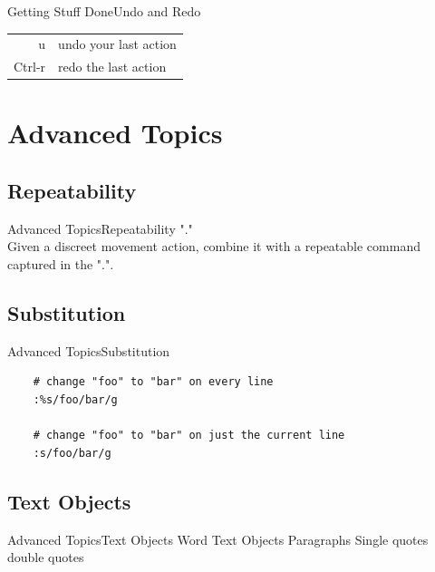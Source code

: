 \documentclass{beamer}
\begin{document}
\begin{frame}[t]{Getting Stuff Done}{Undo and Redo}
    \begin{table}[htpb]
        \centering
        \begin{tabular}{r|l}
            u      & undo your last action \\
            Ctrl-r & redo the last action \\
        \end{tabular}
    \end{table}
\end{frame}

\section{Advanced Topics}

\subsection{Repeatability}
\begin{frame}[t]{Advanced Topics}{Repeatability}
    \vspace{2cm}
    \centering
    "." \\
    \vspace{1cm}
    Given a discreet movement action, combine it with a repeatable command captured in the ".".
\end{frame}

\subsection{Substitution}
\begin{frame}[fragile]{Advanced Topics}{Substitution}
    \begin{lstlisting}
    # change "foo" to "bar" on every line
    :%s/foo/bar/g

    # change "foo" to "bar" on just the current line
    :s/foo/bar/g
    \end{lstlisting}
\end{frame}


\subsection{Text Objects}
\begin{frame}[t]{Advanced Topics}{Text Objects}
    Word Text Objects
    Paragraphs
    Single quotes
    double quotes

    
\end{frame}
\end{document}
